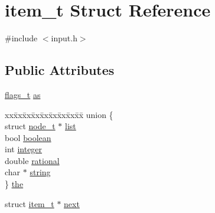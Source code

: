 \hypertarget{structitem__t}{\section{item\-\_\-t Struct Reference}
\label{structitem__t}
}


{\ttfamily \#include $<$input.\-h$>$}

\subsection*{Public Attributes}
\begin{DoxyCompactItemize}
\item 
\hyperlink{input_8h_a1a6b498ba019db3fcd89ae1ff4b45bd7}{flags\-\_\-t} \hyperlink{structitem__t_ae02efe7177a2e249ed330b4d13de080e}{as}
\item 
\begin{tabbing}
xx\=xx\=xx\=xx\=xx\=xx\=xx\=xx\=xx\=\kill
union \{\\
\>struct \hyperlink{structnode__t}{node\_t} $\ast$ \hyperlink{structitem__t_ac34a390f30f67b66038f5380184b03ea}{list}\\
\>bool \hyperlink{structitem__t_ac0addaea95e0b9dfae753a47d13d2587}{boolean}\\
\>int \hyperlink{structitem__t_a2dfca9e3bbcf3387dccd22d5bad14b84}{integer}\\
\>double \hyperlink{structitem__t_ae553bd8a6e792f97324908694a7ff601}{rational}\\
\>char $\ast$ \hyperlink{structitem__t_a681fe9fd0c7699b611d70e04066aff43}{string}\\
\} \hyperlink{structitem__t_ac3d4dafb4c38d619efae2e8ac701dffc}{the}\\

\end{tabbing}\item 
struct \hyperlink{structitem__t}{item\-\_\-t} $\ast$ \hyperlink{structitem__t_aeb875e56e95afe07d0f400f84e0eaef6}{next}
\end{DoxyCompactItemize}


